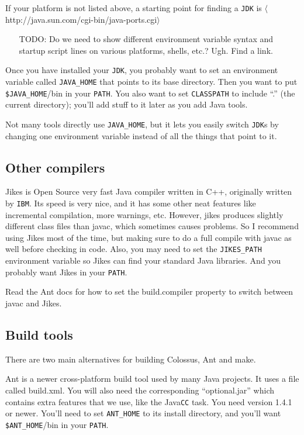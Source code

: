 \documentclass{article}
\begin{document}
If your platform is not listed above, a starting point for finding
a \texttt{JDK} is $\langle$http://java.sun.com/cgi-bin/java-ports.cgi$\rangle$

\begin{itemize}
\item[TODO:]  Do we need to show different environment variable syntax and
startup script lines on various platforms, shells, etc.?  Ugh.  Find
a link.
\end{itemize}

Once you have installed your \texttt{JDK}, you probably want to set an environment 
variable called \texttt{JAVA\_HOME} that points to its base directory.  Then you want 
to put \texttt{\$JAVA\_HOME}/bin in your \texttt{PATH}.  You also want to set \texttt{CLASSPATH} to 
include ``.'' (the current directory); you'll add stuff to it later as you 
add Java tools.

Not many tools directly use \texttt{JAVA\_HOME}, but it lets you easily switch \texttt{JDK}s 
by changing one environment variable instead of all the things that point 
to it.

\subsection{Other compilers}

Jikes \cite{JIKES} is Open Source very fast Java compiler written
in C++, originally
written by \texttt{IBM}.  Its speed is very nice, and it has some other neat 
features like incremental compilation, more warnings, etc.  However, 
jikes produces slightly different class files than javac, which 
sometimes causes problems.  So I recommend using Jikes most of the time,
but making sure to do a full compile with javac as well before checking
in code.
Also, you may need to set the \texttt{JIKES\_PATH} environment variable so Jikes 
can find your standard Java libraries.  And you probably want Jikes in
your \texttt{PATH}.

Read the Ant docs for how to set the build.compiler property to 
switch between javac and Jikes.

\subsection{Build tools}

There are two main alternatives for building Colossus, Ant \cite{ANT} and make.

Ant is a newer cross-platform build tool used by many Java projects.  
It uses a file called build.xml. You will also need the corresponding
``optional.jar'' which contains extra features that we use, like the 
Java\texttt{CC} task.  You need version 1.4.1 or newer.  You'll need to set 
\texttt{ANT\_HOME} to its install directory, and you'll want \texttt{\$ANT\_HOME}/bin in 
your \texttt{PATH}.
\end{document}
